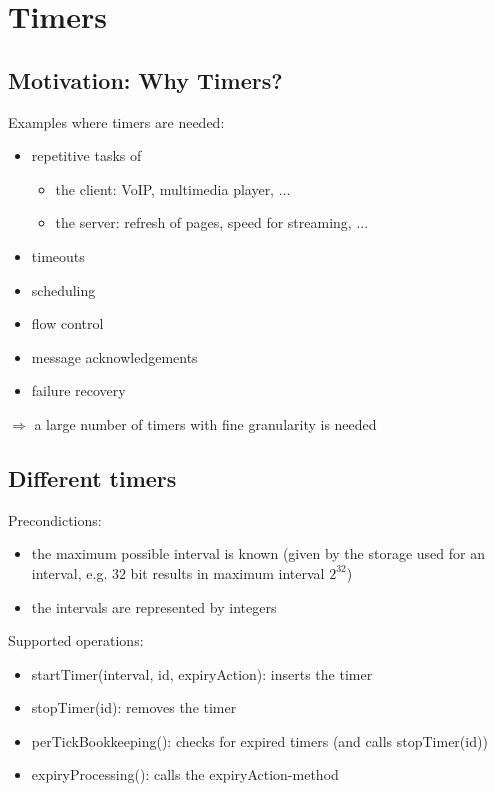 \chapter{Timers} \label{CHAP:TIMERS}

\section{Motivation: Why Timers?}

Examples where timers are needed:
\begin{itemize}
\item repetitive tasks of
	\begin{itemize}
	\item the client: VoIP, multimedia player, ...
	\item the server: refresh of pages, speed for streaming, ...
	\end{itemize}
\item timeouts
\item scheduling
\item flow control
\item message acknowledgements
\item failure recovery
\end{itemize}
$\Rightarrow$ a large number of timers with fine granularity is needed

\section{Different timers}

Precondictions: 
\begin{itemize}
\item the maximum possible interval is known (given by the storage used for an interval, e.g. $32$ bit results in maximum interval $2^{32}$)
\item the intervals are represented by integers
\end{itemize}

Supported operations:
\begin{itemize}
\item startTimer(interval, id, expiryAction): inserts the timer
\item stopTimer(id): removes the timer
\item perTickBookkeeping(): checks for expired timers (and calls stopTimer(id))
\item expiryProcessing(): calls the expiryAction-method
\end{itemize}

